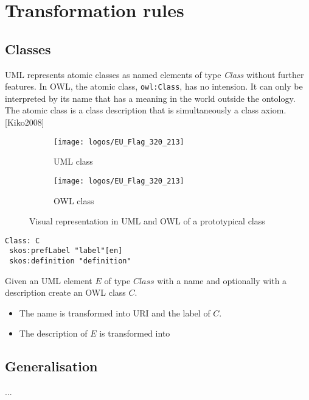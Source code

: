 \section{Transformation rules}
\label{sec:tran-rules}


\subsection{Classes}
\label{sec:classes}

UML represents atomic classes as named elements of type \textit{Class} without further features. In OWL, the atomic class, \texttt{owl:Class}, has no intension. It can only be interpreted by its name that has a meaning in the world outside the ontology. The atomic class is a class description that is simultaneously a class axiom. [Kiko2008]



\begin{figure}[!ht]
	\centering
	\begin{subfigure}{.5\textwidth}
		\centering
		\texttt{[image: logos/EU\_Flag\_320\_213]}
		\caption{UML class}
		\label{fig:class-uml}
	\end{subfigure}%
	\begin{subfigure}{.5\textwidth}
		\centering
		\texttt{[image: logos/EU\_Flag\_320\_213]}
		\caption{OWL class}
		\label{fig:class-owl}
	\end{subfigure}
	\caption{Visual representation in UML and OWL of a prototypical class }
	\label{fig:class}
\end{figure}

\begin{lstlisting}[caption={OWL Class},captionpos=b]
Class: C
 skos:prefLabel "label"[en]
 skos:definition "definition"
\end{lstlisting}

\begin{trule}[Class]
	\label{rule:class}
	Given an UML element $E$ of type $Class$ with a name and optionally with a description  create an OWL class $C$. 
	\begin{itemize}
		\item The name is transformed into URI and the label of $C$.
		\item The description of $E$ is transformed into 
	\end{itemize}		 	
\end{trule}

\subsection{Generalisation}
\label{sec:generalisation}
...




